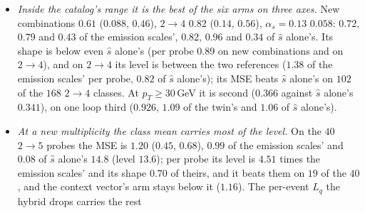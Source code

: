 \documentclass[11pt]{article}
\begin{document}
\begin{itemize}
  \item \emph{Inside the catalog's range it is the best of the six arms on three axes.} New combinations $0.61$
    ($0.088$, $0.46$), $2\to4$ $0.82$ ($0.14$, $0.56$), $\alpha_s=0.13$ $0.058$: $0.72$, $0.79$ and $0.43$ of the
    emission scales', $0.82$, $0.96$ and $0.34$ of $\hat s$ alone's. Its shape is below even $\hat s$ alone's (per
    probe $0.89$ on new combinations and on $2\to4$), and on $2\to4$ its level is between the two references ($1.38$ of
    the emission scales' per probe, $0.82$ of $\hat s$ alone's); its MSE beats $\hat s$ alone's on $102$ of the $168$
    $2\to4$ classes. At $p_T\geq30$\,GeV it is second ($0.366$ against $\hat s$ alone's $0.341$), on one loop third
    ($0.926$, $1.09$ of the twin's and $1.06$ of $\hat s$ alone's).
  \item \emph{At a new multiplicity the class mean carries most of the level.} On the $40$ $2\to5$ probes the MSE is
    $1.20$ ($0.45$, $0.68$), $0.99$ of the emission scales' and $0.08$ of $\hat s$ alone's $14.8$ (level $13.6$); per
    probe its level is $4.51$ times the emission scales' and its shape $0.70$ of theirs, and it beats them on $19$ of
    the $40$, and the context vector's arm stays below it ($1.16$). The per-event $L_q$ the hybrid drops carries the rest

\end{itemize}
\end{document}
